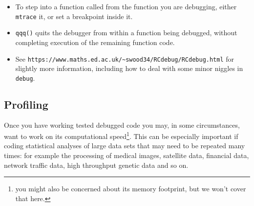 \documentclass[10pt] {article}
\newcommand{\eps}[3]
{{\begin{center}
 \rotatebox{#1}{\scalebox{#2}{\texttt{[image: \#3]}}}
 \end{center}}
}
\theoremstyle{definition}
\begin{document}
\begin{enumerate}
\begin{itemize}
\item To step into a function called from the function you are debugging, either {\tt mtrace} it, or set a breakpoint inside it.
\item \lstinline+qqq()+ quits the debugger from within a function being debugged, without completing execution of the remaining function code.   
\item See \lstinline+https://www.maths.ed.ac.uk/~swood34/RCdebug/RCdebug.html+ for slightly more information, including how to deal with some minor niggles in {\tt debug}.
\end{itemize}  
\end{enumerate}

\eps{0}{0.3}{mtrace.png}


\subsection{Profiling}

Once you have working tested debugged code you may, in some circumstances, want to work on its computational speed\footnote{you might also be concerned about its memory footprint, but we won't cover that here.}. This can be especially important if coding statistical analyses of large data sets that may need to be repeated many times: for example the processing of medical images, satellite data, financial data, network traffic data, high throughput genetic data and so on.  
\end{document}

